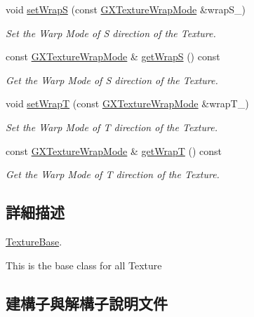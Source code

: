 \begin{DoxyCompactItemize}
void \hyperlink{class_magnum_1_1_texture_base_a40f574577388529dd629ec79bc88f647}{set\+WrapS} (const \hyperlink{class_magnum_1_1_g_x_texture_wrap_mode}{G\+X\+Texture\+Wrap\+Mode} \&wrap\+S\+\_\+)
\begin{DoxyCompactList}\small\item\em Set the Warp Mode of S direction of the Texture. \end{DoxyCompactList}\item 
const \hyperlink{class_magnum_1_1_g_x_texture_wrap_mode}{G\+X\+Texture\+Wrap\+Mode} \& \hyperlink{class_magnum_1_1_texture_base_a1becd0fa36754b6880b7dcd25742dec8}{get\+WrapS} () const 
\begin{DoxyCompactList}\small\item\em Get the Warp Mode of S direction of the Texture. \end{DoxyCompactList}\item 
void \hyperlink{class_magnum_1_1_texture_base_ac77a15bd968e31754b5d34fd7a7385e9}{set\+WrapT} (const \hyperlink{class_magnum_1_1_g_x_texture_wrap_mode}{G\+X\+Texture\+Wrap\+Mode} \&wrap\+T\+\_\+)
\begin{DoxyCompactList}\small\item\em Set the Warp Mode of T direction of the Texture. \end{DoxyCompactList}\item 
const \hyperlink{class_magnum_1_1_g_x_texture_wrap_mode}{G\+X\+Texture\+Wrap\+Mode} \& \hyperlink{class_magnum_1_1_texture_base_a97d035f34c47bcd49b9948eecb4e1861}{get\+WrapT} () const 
\begin{DoxyCompactList}\small\item\em Get the Warp Mode of T direction of the Texture. \end{DoxyCompactList}\end{DoxyCompactItemize}


\subsection{詳細描述}
\hyperlink{class_magnum_1_1_texture_base}{Texture\+Base}. 

This is the base class for all Texture 

\subsection{建構子與解構子說明文件}
